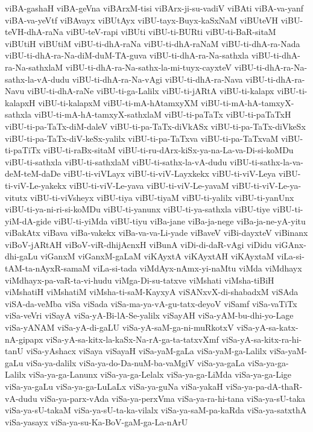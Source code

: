 {viBA-gashaH
viBA-geVna
viBArxM-tisi
viBArx-ji-su-vadiV
viBAti
viBA-va-yanf
viBA-va-yeVtf
viBAvayx
viBUtAyx
viBU-tayx-Buyx-kaSxNaM
viBUteVH
viBU-teVH-dhA-raNa
viBU-teV-rapi
viBUti
viBU-ti-BURti
viBU-ti-BaR-sitaM
viBUtiH
viBUtiM
viBU-ti-dhA-raNa
viBU-ti-dhA-raNaM
viBU-ti-dhA-ra-Nada
viBU-ti-dhA-ra-Na-diM-duM-TA-guva
viBU-ti-dhA-ra-Na-sathxla
viBU-ti-dhA-ra-Na-sathxlaM
viBU-ti-dhA-ra-Na-sathx-la-mi-tuyx-cayxteV
viBU-ti-dhA-ra-Na-sathx-la-vA-dudu
viBU-ti-dhA-ra-Na-vAgi
viBU-ti-dhA-ra-Nava
viBU-ti-dhA-ra-Navu
viBU-ti-dhA-raNe
viBU-ti-ga-Lalilx
viBU-ti-jARtA
viBU-ti-kalapx
viBU-ti-kalapxH
viBU-ti-kalapxM
viBU-ti-mA-hAtamxyXM
viBU-ti-mA-hA-tamxyX-sathxla
viBU-ti-mA-hA-tamxyX-sathxlaM
viBU-ti-paTaTx
viBU-ti-paTaTxH
viBU-ti-pa-TaTx-diM-daleV
viBU-ti-pa-TaTx-diVkASx
viBU-ti-pa-TaTx-diVkeSx
viBU-ti-pa-TaTx-diV-keSx-yalilx
viBU-ti-pa-TaTxva
viBU-ti-pa-TaTxvaM
viBU-ti-paTiTx
viBU-ti-raBx-sitaM
viBU-ti-ru-dArx-kiSx-ya-na-La-va-Di-si-koMDu
viBU-ti-sathxla
viBU-ti-sathxlaM
viBU-ti-sathx-la-vA-dudu
viBU-ti-sathx-la-va-deM-teM-daDe
viBU-ti-viVLayx
viBU-ti-viV-Layxkekx
viBU-ti-viV-Leya
viBU-ti-viV-Le-yakekx
viBU-ti-viV-Le-yava
viBU-ti-viV-Le-yavaM
viBU-ti-viV-Le-ya-vitutx
viBU-ti-viVsheyx
viBU-tiya
viBU-tiyaM
viBU-ti-yalilx
viBU-ti-yanUnx
viBU-ti-ya-ni-ri-si-koMDu
viBU-ti-yanunx
viBU-ti-ya-sathxla
viBU-tiye
viBU-ti-yiM-dA-gide
viBU-ti-yiMda
viBU-tiyu
viBa-jane
viBa-ja-nege
viBa-ja-ne-yA-yitu
viBakAtx
viBava
viBa-vakekx
viBa-va-va-Li-yade
viBaveV
viBi-dayxteV
viBinanx
viBoV-jARtAH
viBoV-viR-dhijAcnxH
viBunA
viDi-di-daR-vAgi
viDidu
viGAnx-dhi-gaLu
viGanxM
viGanxM-gaLaM
viKAyxtA
viKAyxtAH
viKAyxtaM
viLa-si-tAM-ta-nAyxR-samaM
viLa-si-tada
viMdAyx-nAmx-yi-naMtu
viMda
viMdhayx
viMdhayx-pa-vaR-ta-vi-hudu
viMga-Di-su-tatxve
viMshati
viMsha-tiBiH
viMshatiH
viMshatiM
viMsha-ti-saM-KayxyA
viSANxvX-di-shabadxM
viSAda
viSA-da-veMba
viSa
viSada
viSa-ma-ya-vA-gu-tatx-deyoV
viSamf
viSa-vaTiTx
viSa-veVri
viSayA
viSa-yA-Bi-lA-Se-yalilx
viSayAH
viSa-yAM-bu-dhi-yo-Lage
viSa-yANAM
viSa-yA-di-gaLU
viSa-yA-saM-ga-ni-muRkotxV
viSa-yA-sa-katx-nA-gipapx
viSa-yA-sa-kitx-la-kaSx-Na-rA-ga-ta-tatxvXmf
viSa-yA-sa-kitx-ra-hi-tanU
viSa-yAshacx
viSaya
viSayaH
viSa-yaM-gaLa
viSa-yaM-ga-Lalilx
viSa-yaM-gaLu
viSa-ya-dalilx
viSa-ya-do-Da-nuM-ba-vaMgiV
viSa-ya-gaLa
viSa-ya-ga-Lalilx
viSa-ya-ga-Lanunx
viSa-ya-ga-Lelalx
viSa-ya-ga-LiMda
viSa-ya-ga-Lige
viSa-ya-gaLu
viSa-ya-ga-LuLaLx
viSa-ya-guNa
viSa-yakaH
viSa-ya-pa-dA-thaR-vA-dudu
viSa-ya-parx-vAda
viSa-ya-perxVma
viSa-ya-ra-hi-tana
viSa-ya-sU-taka
viSa-ya-sU-takaM
viSa-ya-sU-ta-ka-vilalx
viSa-ya-saM-pa-kaRda
viSa-ya-satxthA
viSa-yasayx
viSa-ya-su-Ka-BoV-gaM-ga-La-nArU
}
